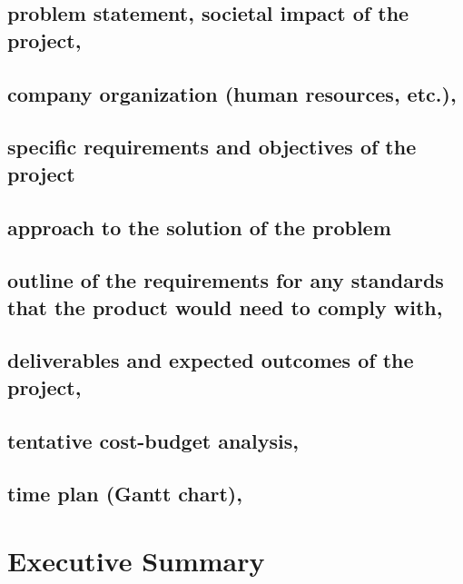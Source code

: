 \documentclass[a4paper,12pt]{article}
\newcommand{\blankpage}{
	\- \\[9cm]	
	{ \centering \textit{This page intentionally left blank.} \par }
	\- \\[9cm]
}%
\begin{document}
\tableofcontents
\newpage



	
\subsection{problem statement, societal impact of the project,}

\subsection{company organization (human resources, etc.),}


\subsection{specific requirements and objectives of the project}


\subsection{approach to the solution of the problem}


\subsection{outline of the requirements for any standards that the product would need to comply with,}


\subsection{deliverables and expected outcomes of the project,}


\subsection{tentative cost-budget analysis,}

\subsection{time plan (Gantt chart),}



\section{Executive Summary}
\end{document}
